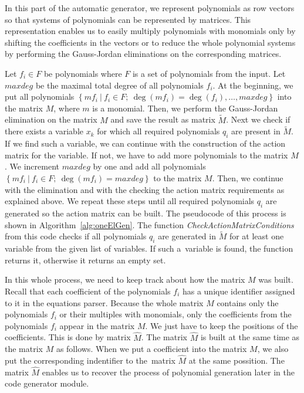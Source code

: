 In this part of the automatic generator, we represent polynomials as row vectors so that systems of polynomials can be represented by matrices. This representation enables us to easily multiply polynomials with monomials only by shifting the coefficients in the vectors or to reduce the whole polynomial systems by performing the Gauss-Jordan eliminations on the corresponding matrices.

Let $f_i \in F$ be polynomials where $F$ is a set of polynomials from the input. Let $maxdeg$ be the maximal total degree of all polynomials $f_i$. At the beginning, we put all polynomials $\left\{m f_i\ |\ f_i \in F;\ \deg(m f_i) = \deg(f_i),\dots, maxdeg\right\}$ into the matrix $M$, where $m$ is a monomial. Then, we perform the Gauss-Jordan elimination on the matrix $M$ and save the result as matrix $\tilde{M}$. Next we check if there exists a variable $x_k$ for which all required polynomials $q_i$ are present in $\tilde{M}$. If we find such a variable, we can continue with the construction of the action matrix for the variable. If not, we have to add more polynomials to the matrix $M$. We increment $maxdeg$ by one and add all polynomials $\left\{m f_i\ |\ f_i \in F;\ \deg(m f_i) = maxdeg\right\}$ to the matrix $M$. Then, we continue with the elimination and with the checking the action matrix requirements as explained above. We repeat these steps until all required polynomials $q_i$ are generated so the action matrix can be built. The pseudocode of this process is shown in Algorithm~\ref{alg:oneElGen}. The function \textit{CheckActionMatrixConditions} from this code checks if all polynomials $q_i$ are generated in $\tilde{M}$ for at least one variable from the given list of variables. If such a~variable is found, the function returns it, otherwise it returns an empty set.



In this whole process, we need to keep track about how the matrix $M$ was built. Recall that each coefficient of the polynomials $f_i$ has a unique identifier assigned to it in the equations parser. Because the whole matrix $M$ contains only the polynomials $f_i$ or their multiples with monomials, only the coefficients from the polynomials $f_i$ appear in the matrix $M$. We just have to keep the positions of the coefficients. This is done by matrix $\hat{M}$. The matrix $\hat{M}$ is built at the same time as the matrix $M$ as follows. When we put a coefficient into the matrix $M$, we also put the corresponding indentifier to the~matrix $\hat{M}$ at the same possition. The matrix $\hat{M}$ enables us to recover the process of polynomial generation later in the code generator module.


